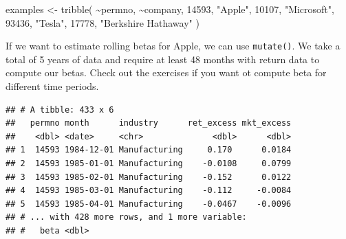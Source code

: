 \documentclass[
]{book}
\newenvironment{Shaded}{\begin{snugshade}}{\end{snugshade}}
\newcommand{\AttributeTok}[1]{\textcolor[rgb]{0.61,0.61,0.61}{#1}}
\newcommand{\DecValTok}[1]{\textcolor[rgb]{0.06,0.06,0.06}{#1}}
\newcommand{\ErrorTok}[1]{\textcolor[rgb]{0.14,0.14,0.14}{\textbf{#1}}}
\newcommand{\FunctionTok}[1]{\textcolor[rgb]{0,0,0}{#1}}
\newcommand{\NormalTok}[1]{#1}
\newcommand{\OtherTok}[1]{\textcolor[rgb]{0.37,0.37,0.37}{#1}}
\newcommand{\SpecialCharTok}[1]{\textcolor[rgb]{0,0,0}{#1}}
\newcommand{\StringTok}[1]{\textcolor[rgb]{0.5,0.5,0.5}{#1}}
\begin{document}
\begin{Shaded}
\begin{Highlighting}[]
\NormalTok{examples }\OtherTok{\textless{}{-}} \FunctionTok{tribble}\NormalTok{(}
  \SpecialCharTok{\textasciitilde{}}\NormalTok{permno, }\SpecialCharTok{\textasciitilde{}}\NormalTok{company,}
  \DecValTok{14593}\NormalTok{, }\StringTok{"Apple"}\NormalTok{,}
  \DecValTok{10107}\NormalTok{, }\StringTok{"Microsoft"}\NormalTok{,}
  \DecValTok{93436}\NormalTok{, }\StringTok{"Tesla"}\NormalTok{,}
  \DecValTok{17778}\NormalTok{, }\StringTok{"Berkshire Hathaway"}
\NormalTok{)}
\end{Highlighting}
\end{Shaded}

If we want to estimate rolling betas for Apple, we can use \texttt{mutate()}.
We take a total of 5 years of data and require at least 48 months with return data to compute our betas.
Check out the exercises if you want ot compute beta for different time periods.

\begin{Shaded}
\end{Shaded}

\begin{verbatim}
## # A tibble: 433 x 6
##   permno month      industry      ret_excess mkt_excess
##    <dbl> <date>     <chr>              <dbl>      <dbl>
## 1  14593 1984-12-01 Manufacturing     0.170      0.0184
## 2  14593 1985-01-01 Manufacturing    -0.0108     0.0799
## 3  14593 1985-02-01 Manufacturing    -0.152      0.0122
## 4  14593 1985-03-01 Manufacturing    -0.112     -0.0084
## 5  14593 1985-04-01 Manufacturing    -0.0467    -0.0096
## # ... with 428 more rows, and 1 more variable:
## #   beta <dbl>
\end{verbatim}
\end{document}
